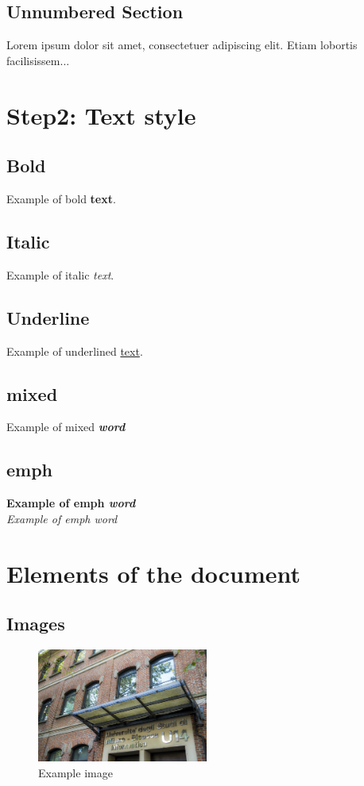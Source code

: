 \documentclass[a4paper, oneside]{book}
\begin{document}
\section*{Unnumbered Section}
Lorem ipsum dolor sit amet, consectetuer adipiscing elit.  
Etiam lobortis facilisissem...

\chapter{Step2: Text style}
\section{Bold}
Example of bold \textbf{text}.
\section{Italic}
Example of italic \textit{text}.
\section{Underline}
Example of underlined \underline{text}.
\section{mixed}
Example of mixed \textbf{\textit{word}}
\section{emph}
\textbf{Example of emph \emph{word}}\\
\textit{Example of emph \emph{word}}

\chapter{Elements of the document}
\section{Images}


\begin{figure}[H]
\centering
\includegraphics[width=0.5\textwidth]{u14.jpg}
\caption{Example image}
\label{img:ref_image}
\end{figure}
\end{document}

